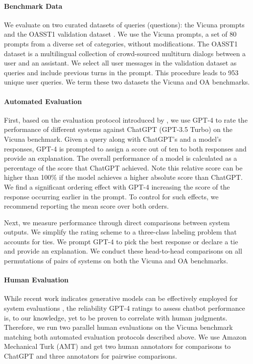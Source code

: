\documentclass{article}
\begin{document}
\paragraph{Benchmark Data} We evaluate on two curated datasets of queries (questions): the Vicuna prompts \citep{vicuna2023} and the OASST1 validation dataset \citep{kopf2023openassistant}. We use the Vicuna prompts, a set of 80 prompts from a diverse set of categories, without modifications. The OASST1 dataset is a multilingual collection of crowd-sourced multiturn dialogs between a user and an assistant. We select all user messages in the validation dataset as queries and include previous turns in the prompt. This procedure leads to 953 unique user queries. We term these two datasets the Vicuna and OA benchmarks.

\paragraph{Automated Evaluation}
First, based on the evaluation protocol introduced by \citet{vicuna2023}, we use GPT-4 to rate the performance of different systems against ChatGPT (GPT-3.5 Turbo) on the Vicuna benchmark. Given a query along with ChatGPT's and a model's responses, GPT-4 is prompted to assign a score out of ten to both responses and provide an explanation. The overall performance of a model is calculated as a percentage of the score that ChatGPT achieved. Note this relative score can be higher than 100\% if the model achieves a higher absolute score than ChatGPT. We find a significant ordering effect with GPT-4 increasing the score of the response occurring earlier in the prompt. To control for such effects, we recommend reporting the mean score over both orders.

Next, we measure performance through direct comparisons between system outputs. We simplify the rating scheme to a three-class labeling problem that accounts for ties. We prompt GPT-4 to pick the best response or declare a tie and provide an explanation. We conduct these head-to-head comparisons on all permutations of pairs of systems on both the Vicuna and OA benchmarks.

\paragraph{Human Evaluation}
While recent work indicates generative models can be effectively employed for system evaluations \citep{fu2023gptscore}, the reliability GPT-4 ratings to assess chatbot performance is, to our knowledge, yet to be proven to correlate with human judgments. Therefore, we run two parallel human evaluations on the Vicuna benchmark matching both automated evaluation protocols described above. We use Amazon Mechanical Turk (AMT) and get two human annotators for comparisons to ChatGPT and three annotators for pairwise comparisons. 
\end{document}
